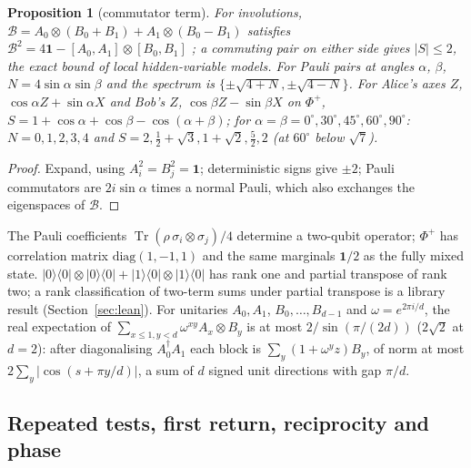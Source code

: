 \documentclass[aps,pra,onecolumn,superscriptaddress,nofootinbib,10pt]{revtex4-2}
\newtheorem{proposition}[theorem]{Proposition}
\theoremstyle{definition}
\theoremstyle{remark}
\newcommand{\tr}{\operatorname{Tr}}
\begin{document}
\begin{proposition}[commutator term]\label{prop:bdlandau}
For involutions, $\mathcal B=A_0\otimes(B_0+B_1)+A_1\otimes(B_0-B_1)$ satisfies $\mathcal B^2=4\mathbf1-[A_0,A_1]\otimes[B_0,B_1]$ \cite{n4:Landau}; a commuting pair on either side
gives $\lvert S\rvert\le2$, the exact bound of local hidden-variable models.  For Pauli pairs at angles $\alpha$, $\beta$, $N=4\sin\alpha\sin\beta$ and the
spectrum is $\{\pm\sqrt{4+N},\pm\sqrt{4-N}\}$.  For Alice's axes $Z$, $\cos\alpha Z+\sin\alpha X$ and Bob's $Z$, $\cos\beta Z-\sin\beta X$ on $\Phi^+$, $S=1+\cos\alpha+\cos\beta-\cos(\alpha+\beta)$;
for $\alpha=\beta=0^\circ,30^\circ,45^\circ,60^\circ,90^\circ$: $N=0,1,2,3,4$ and $S=2,\tfrac12+\sqrt3,1+\sqrt2,\tfrac52,2$ (at $60^\circ$ below $\sqrt7$).
\end{proposition}
\begin{proof}
Expand, using $A_i^2=B_j^2=\mathbf1$; deterministic signs give $\pm2$; Pauli commutators are $2i\sin\alpha$ times a normal Pauli, which also
exchanges the eigenspaces of $\mathcal B$.
\end{proof}
\noindent The Pauli coefficients $\tr(\rho\,\sigma_i\otimes\sigma_j)/4$ determine a two-qubit operator; $\Phi^+$ has correlation matrix $\mathrm{diag}(1,-1,1)$ and the same
marginals $\mathbf1/2$ as the fully mixed state.  $\lvert0\rangle\langle0\rvert\otimes\lvert0\rangle\langle0\rvert+\lvert1\rangle\langle0\rvert\otimes\lvert1\rangle\langle0\rvert$ has rank one and partial transpose of rank two; a rank classification
of two-term sums under partial transpose is a library result (Section~\ref{sec:lean}).  For unitaries $A_0,A_1$,
$B_0,\dots,B_{d-1}$ and $\omega=e^{2\pi i/d}$, the real expectation of $\sum_{x\le1,y<d}\omega^{xy}A_x\otimes B_y$ is at most $2/\sin(\pi/(2d))$ ($2\sqrt2$ at $d=2$): after
diagonalising $A_0^\dagger A_1$ each block is $\sum_y(1+\omega^yz)B_y$, of norm at most $2\sum_y\lvert\cos(s+\pi y/d)\rvert$, a sum of $d$ signed unit directions with gap $\pi/d$.

\subsection{Repeated tests, first return, reciprocity and phase}\label{sec:bdmonitor}
\end{document}
